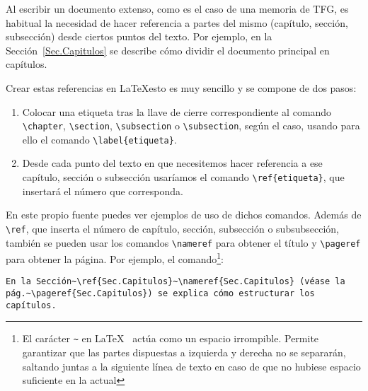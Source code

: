 Al escribir un documento extenso, como es el caso de una memoria de TFG, es habitual la necesidad de hacer referencia a partes del mismo (capítulo, sección, subsección) desde ciertos puntos del texto. Por ejemplo, en la Sección~\ref{Sec.Capitulos} se describe cómo dividir el documento principal en capítulos.

Crear estas referencias en \LaTeX esto es muy sencillo y se compone de dos pasos:

\begin{enumerate}
    \item Colocar una etiqueta tras la llave de cierre correspondiente al comando \verb|\chapter|, \verb|\section|, \verb|\subsection| o \verb|\subsection|, según el caso, usando para ello el comando \verb|\label{etiqueta}|.
    
    \item Desde cada punto del texto en que necesitemos hacer referencia a ese capítulo, sección o subsección usaríamos el comando \verb|\ref{etiqueta}|, que insertará el número que corresponda.
\end{enumerate}

En este propio fuente puedes ver ejemplos de uso de dichos comandos. Además de \verb|\ref|, que inserta el número de capítulo, sección, subsección o subsubsección, también se pueden usar los comandos \verb|\nameref| para obtener el título y \verb|\pageref| para obtener la página. Por ejemplo, el comando\footnote{El carácter \texttt{\~} en \LaTeX~ actúa como un espacio irrompible. Permite garantizar que las partes dispuestas a izquierda y derecha no se separarán, saltando juntas a la siguiente línea de texto en caso de que no hubiese espacio suficiente en la actual}:

\begin{verbatim}
En la Sección~\ref{Sec.Capitulos}~\nameref{Sec.Capitulos} (véase la 
pág.~\pageref{Sec.Capitulos}) se explica cómo estructurar los capítulos.
\end{verbatim}

